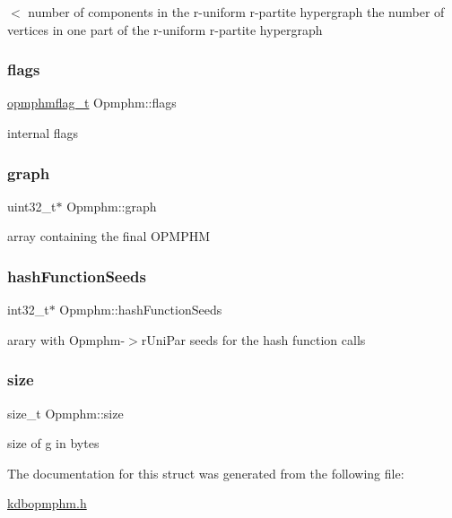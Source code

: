 $<$ number of components in the r-\/uniform r-\/partite hypergraph the number of vertices in one part of the r-\/uniform r-\/partite hypergraph \mbox{\label{structOpmphm_af321bfb7ed0bd9fc2c62a4b07568e3c6}} 
\subsubsection{\texorpdfstring{flags}{flags}}
{\footnotesize\ttfamily \hyperlink{kdbopmphm_8h_a2485eafcb5c3e235f15e91d98ec39eef}{opmphmflag\+\_\+t} Opmphm\+::flags}

internal flags \mbox{\label{structOpmphm_a9346a5fabe0c3a96abd70bb18cbd7fa2}} 
\subsubsection{\texorpdfstring{graph}{graph}}
{\footnotesize\ttfamily uint32\+\_\+t$\ast$ Opmphm\+::graph}

array containing the final O\+P\+M\+P\+HM \mbox{\label{structOpmphm_a522b3ab16ceb22828b54333868c9324d}} 
\subsubsection{\texorpdfstring{hash\+Function\+Seeds}{hashFunctionSeeds}}
{\footnotesize\ttfamily int32\+\_\+t$\ast$ Opmphm\+::hash\+Function\+Seeds}

arary with Opmphm-\/$>$r\+Uni\+Par seeds for the hash function calls \mbox{\label{structOpmphm_a72e7343b4ea87b27891e760f03fd2b96}} 
\subsubsection{\texorpdfstring{size}{size}}
{\footnotesize\ttfamily size\+\_\+t Opmphm\+::size}

size of g in bytes 

The documentation for this struct was generated from the following file\+:\begin{DoxyCompactItemize}
\item 
\hyperlink{kdbopmphm_8h}{kdbopmphm.\+h}\end{DoxyCompactItemize}
